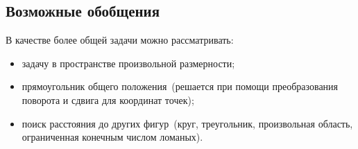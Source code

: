 \subsection{Возможные обобщения}
В качестве более общей задачи можно рассматривать:
\begin{itemize}
\item задачу в пространстве произвольной размерности;
\item прямоугольник общего положения~(решается при помощи преобразования поворота и сдвига для координат точек);
\item поиск расстояния до других фигур~(круг, треугольник, произвольная область, ограниченная конечным числом ломаных).
\end{itemize}
